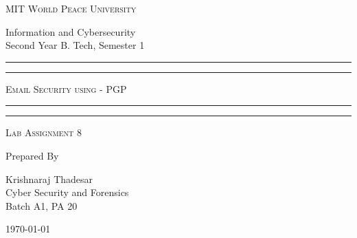 \documentclass[11pt]{article}
\begin{document}
\begin{titlepage}
    \centering


    \huge\textsc{
        MIT World Peace University
    }\\

    \vspace{0.75\baselineskip} %

    \LARGE{
        Information and Cybersecurity\\
        Second Year B. Tech, Semester 1
    }

    \vfill %


    \rule{\textwidth}{1.6pt}\vspace*{-\baselineskip}\vspace*{2pt}
    \rule{\textwidth}{0.6pt}
    \vspace{0.75\baselineskip} %



    \huge{\textsc{
            Email Security using - PGP
        }} \\



    \vspace{0.5\baselineskip} %
    \rule{\textwidth}{0.6pt}\vspace*{-\baselineskip}\vspace*{2.8pt}
    \rule{\textwidth}{1.6pt}

    \vspace{1\baselineskip} %


    \LARGE\textsc{
        Lab Assignment 8
    } %
    \vfill


    Prepared By
    \vspace{0.5\baselineskip} %

    \Large{
        Krishnaraj Thadesar \\
        Cyber Security and Forensics\\
        Batch A1, PA 20
    }


    \vspace{0.5\baselineskip} %
    \today

\end{titlepage}
\end{document}
